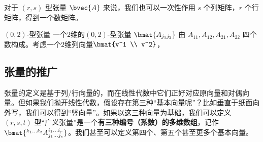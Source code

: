 对于 $(r, s)$ 型张量 $\bvec{A}$ 来说，我们也可以一次性作用 $s$ 个列矩阵，$r$ 个行矩阵，得到一个数矩阵。

\begin{example}{$(0, 2)$-型张量}
一个$2$维的$(0, 2)$-型张量 $\bmat{A_{j_1 j_2}}$ 由 $A_{1 1}, A_{1 2}, A_{2 1}, A_{2 2}$ 四个数构成。考虑一个$2$维列向量$\bmat{v^1 \\ v^2}$，
\end{example}


\subsection{张量的推广}

张量的定义是基于列/行向量的，而在线性代数中它们正好对应原向量和对偶向量。但如果我们抛开线性代数，假设存在第三种“基本向量呢”？比如垂直于纸面向外写，我们可以得到“竖向量”。如果以这三种向量为基础，我们可以定义 $(r, s, t)$ 型“广义张量”是一个\textbf{有三种编号（系数）的多维数组}，记作 $\bmat{{}^{k_1 \dots k_t}A_{j_1 \dots j_s}^{i_1 \dots i_r}}$。我们甚至可以定义第四个、第五个甚至更多个基本向量。
